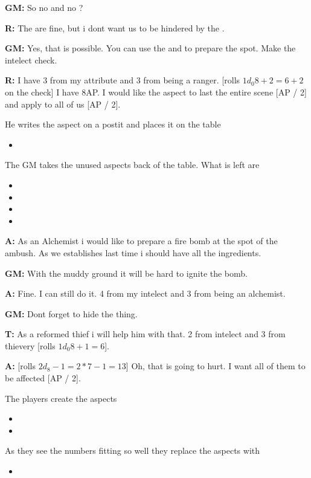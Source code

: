 \documentclass[11pt]{article}
\begin{document}
{\textbf{GM:} So no  and no ?

\textbf{R:} The  are fine, but i dont want us to be hindered by the .

\textbf{GM:} Yes, that is possible. You can use the  and  to prepare the spot. Make the intelect check.

\textbf{R:} I have 3 from my attribute and 3 from being a ranger. [rolls \(1 d_0 8 + 2 = 6 + 2\) on the check] I have 8AP. I would like the aspect to last the entire scene [AP / 2] and apply to all of us [AP / 2].

He writes the aspect on a postit and places it on the table
\begin{itemize}
\item {}
\end{itemize}
The GM takes the unused aspects back of the table. What is left are
\begin{itemize}
\item {}
\item {}
\item {}
\item {}
\end{itemize}

\textbf{A:} As an Alchemist i would like to prepare a fire bomb at the spot of the ambush. As we establishes last time i should have all the ingredients.

\textbf{GM:} With the muddy ground it will be hard to ignite the bomb.

\textbf{A:} Fine. I can still do it. 4 from my intelect and 3 from being an alchemist.

\textbf{GM:} Dont forget to hide the thing.

\textbf{T:} As a reformed thief i will help him with that. 2 from intelect and 3 from thievery [rolls \(1 d_0 8 + 1 = 6\)].

\textbf{A:} [rolls \(2 d_8 - 1 = 2*7 -1 = 13\)] Oh, that is going to hurt. I want all of them to be affected [AP / 2].

The players create the aspects
\begin{itemize}
\item {}
\item {}
\end{itemize}
As they see the numbers fitting so well they replace the aspects with
\begin{itemize}
\item {}
\end{itemize}

}
\end{document}
